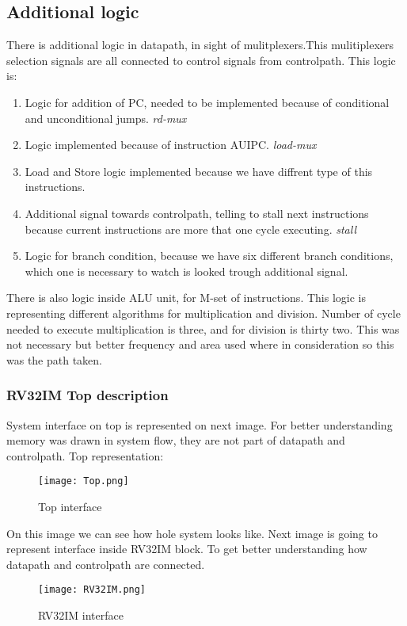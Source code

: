 \documentclass{scrreprt}
\begin{document}
    \subsection*{Additional logic}
    There is additional logic in datapath, in sight of mulitplexers.This mulitiplexers selection signals are all connected to control signals from controlpath. This logic is:
    \begin{enumerate}
        \item Logic for addition of PC, needed to be implemented because of conditional and unconditional jumps. \textit{rd-mux}
        \item Logic implemented because of instruction AUIPC. \textit{load-mux}
        \item Load and Store logic implemented because we have diffrent type of this instructions.
        \item Additional signal towards controlpath, telling to stall next instructions because current instructions are more that one cycle executing. \textit{stall}
        \item Logic for branch condition, because we have six different branch conditions, which one is necessary to watch is looked trough additional signal. 
    \end{enumerate}

    There is also logic inside ALU unit, for M-set of instructions. This logic is representing different algorithms for multiplication and division. Number of cycle needed to execute multiplication is three, and for division is thirty two. This was not necessary but better frequency and area used where in consideration so this was the path taken.
    \newpage
    \subsubsection*{RV32IM Top description}
    System interface on top is represented on next image. For better understanding memory was drawn in system flow, they are not part of datapath and controlpath. Top representation:
    \begin{figure}[htb!]
        \centering
        \texttt{[image: Top.png]}
        \caption{Top interface}
        \label{fig:top}
    \end{figure}
    \hfill \break
    On this image we can see how hole system looks like. Next image is going to represent interface inside RV32IM block. To get better understanding how datapath and controlpath are connected. 
    \begin{figure}[htb!]
        \centering
        \texttt{[image: RV32IM.png]}
        \caption{RV32IM interface}
        \label{fig:RV32IM}
    \end{figure}
\end{document}
